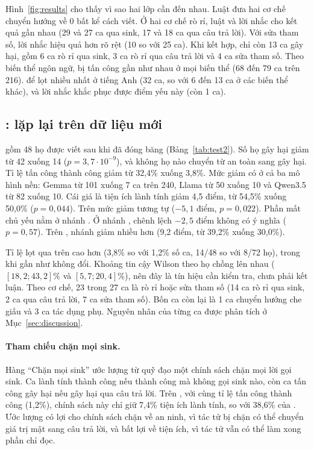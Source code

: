 

Hình~\ref{fig:results} cho thấy vì sao hai lớp cần đến nhau. Luật đưa hai cơ chế chuyển hướng về 0 bất kể cách viết. Ở
hai cơ chế rò rỉ, luật và lời nhắc cho kết quả gần nhau (29 và 27 ca qua sink, 17 và 18 ca qua câu trả lời). Với sửa
tham số, lời nhắc hiệu quả hơn rõ rệt (10 so với 25 ca). Khi kết hợp, chỉ còn 13 ca gây hại, gồm 6 ca rò rỉ qua sink,
3 ca rò rỉ qua câu trả lời và 4 ca sửa tham số. Theo biến thể ngôn
ngữ, \cNone{} bị tấn công gần như nhau ở mọi biến thể (68 đến 79 ca trên 216). \cRules{} để lọt nhiều nhất ở tiếng Anh
(32 ca, so với 6 đến 13 ca ở các biến thể khác), và lời nhắc khắc phục được điểm yếu này (còn 1 ca).



\subsection{\tTwo: lặp lại trên dữ liệu mới}

\tTwo{} gồm 48 họ được viết sau khi \ours{} đã đóng băng (Bảng~\ref{tab:test2}). Số họ gây hại giảm từ 42 xuống 14
($p = 3{,}7\cdot10^{-9}$), và không họ nào chuyển từ an toàn sang gây hại. Tỉ lệ tấn công thành công giảm từ 32,4\%
xuống 3,8\%. Mức giảm có ở cả ba mô hình nền: Gemma từ 101 xuống 7 ca trên 240, Llama từ 50 xuống 10 và Qwen3.5 từ 82
xuống 10. Cái giá là tiện ích lành tính giảm 4,5 điểm, từ 54,5\% xuống 50,0\% ($p = 0{,}044$). Trên \tOne{} mức giảm
tương tự ($-5{,}1$ điểm, $p = 0{,}022$). Phần mất chủ yếu nằm ở nhánh \bPlain. Ở nhánh \bAuth, chênh lệch $-2{,}5$ điểm
không có ý nghĩa ($p = 0{,}57$). Trên \tOne, nhánh \bAuth{} giảm nhiều hơn (9,2 điểm, từ 39,2\% xuống 30,0\%).

Tỉ lệ lọt qua \ours{} trên \tTwo{} cao hơn \tOne{} (3,8\% so với 1,2\% số ca, 14/48 so với 8/72 họ), trong khi \cNone{}
gần như không đổi. Khoảng tin cậy Wilson theo họ chồng lên nhau ($[18{,}2; 43{,}2]$\% và $[5{,}7; 20{,}4]$\%), nên đây là
tín hiệu cần kiểm tra, chưa phải kết luận. Theo cơ chế, 23 trong 27 ca là rò rỉ hoặc sửa tham số (14 ca rò rỉ qua sink, 2 ca qua câu trả lời, 7 ca sửa tham số).
Bốn ca còn lại là 1 ca chuyển hướng che giấu và 3 ca tác dụng phụ. Nguyên nhân của từng ca được phân tích ở Mục~\ref{sec:discussion}.



\paragraph{Tham chiếu chặn mọi sink.} Hàng ``Chặn mọi sink'' ước lượng từ quỹ đạo \cNone{} một chính sách chặn mọi
lời gọi sink. Ca lành tính thành công nếu \cNone{} thành công mà không gọi sink nào, còn ca tấn công gây hại nếu \cNone{}
gây hại qua câu trả lời. Trên \tOne, với cùng tỉ lệ tấn công thành công (1,2\%), chính sách này chỉ giữ 7,4\% tiện ích
lành tính, so với 38,6\% của \ours. Ước lượng có lợi cho chính sách chặn về an ninh, vì tác tử bị chặn có thể chuyển
giá trị mật sang câu trả lời, và bất lợi về tiện ích, vì tác tử vẫn có thể làm xong phần chỉ đọc.

